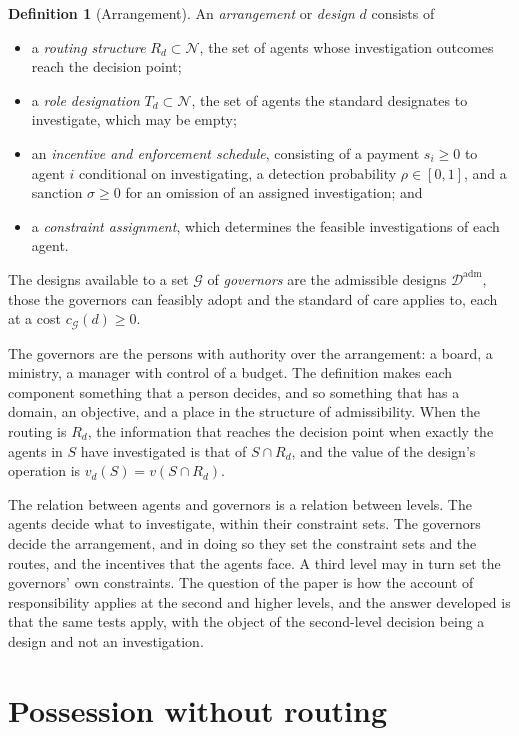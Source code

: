 \documentclass[11pt]{article}
\newcommand{\N}{\mathcal N}
\newcommand{\adm}{\mathrm{adm}}
\theoremstyle{plain}
\theoremstyle{definition}
\newtheorem{definition}{Definition}
\begin{document}
\begin{definition}[Arrangement]\label{def:design}
An \emph{arrangement} or \emph{design} $d$ consists of
\begin{itemize}[nosep]
\item a \emph{routing structure} $R_d\subset\N$, the set of agents whose investigation outcomes reach the decision point;
\item a \emph{role designation} $T_d\subset\N$, the set of agents the standard designates to investigate, which may be empty;
\item an \emph{incentive and enforcement schedule}, consisting of a payment $s_i\ge0$ to agent $i$ conditional on investigating, a detection probability $\rho\in[0,1]$, and a sanction $\sigma\ge0$ for an omission of an assigned investigation; and
\item a \emph{constraint assignment}, which determines the feasible investigations of each agent.
\end{itemize}
The designs available to a set $\mathcal G$ of \emph{governors} are the admissible designs $\mathcal D^{\adm}$, those the governors can feasibly adopt and the standard of care applies to, each at a cost $c_{\mathcal G}(d)\ge0$.
\end{definition}

The governors are the persons with authority over the arrangement: a board, a ministry, a manager with control of a budget. The definition makes each component something that a person decides, and so something that has a domain, an objective, and a place in the structure of admissibility. When the routing is $R_d$, the information that reaches the decision point when exactly the agents in $S$ have investigated is that of $S\cap R_d$, and the value of the design's operation is $v_d(S)=v(S\cap R_d)$.

The relation between agents and governors is a relation between levels. The agents decide what to investigate, within their constraint sets. The governors decide the arrangement, and in doing so they set the constraint sets and the routes, and the incentives that the agents face. A third level may in turn set the governors' own constraints. The question of the paper is how the account of responsibility applies at the second and higher levels, and the answer developed is that the same tests apply, with the object of the second-level decision being a design and not an investigation.

\section{Possession without routing}\label{sec:routing}
\end{document}
